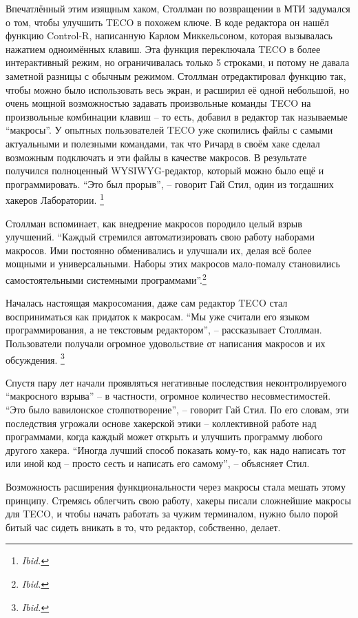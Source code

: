 Впечатлённый этим изящным хаком, Столлман по возвращении в МТИ задумался о том, чтобы улучшить TECO в похожем ключе. В коде редактора он нашёл функцию Control-R, написанную Карлом Миккельсоном, которая вызывалась нажатием одноимённых клавиш. Эта функция переключала TECO в более интерактивный режим, но ограничивалась только 5 строками, и потому не давала заметной разницы с обычным режимом. Столлман отредактировал функцию так, чтобы можно было использовать весь экран, и расширил её одной небольшой, но очень мощной возможностью задавать произвольные команды TECO на произвольные комбинации клавиш -- то есть, добавил в редактор так называемые \enquote{макросы}. У опытных пользователей TECO уже скопились файлы с самыми актуальными и полезными командами, так что Ричард в своём хаке сделал возможным подключать и эти файлы в качестве макросов. В результате получился полноценный WYSIWYG-редактор, который можно было ещё и программировать. \enquote{Это был прорыв}, -- говорит Гай Стил, один из тогдашних хакеров Лаборатории. \footnote{\textit{Ibid.}}

Столлман вспоминает, как внедрение макросов породило целый взрыв улучшений. \enquote{Каждый стремился автоматизировать свою работу наборами макросов. Ими постоянно обменивались и улучшали их, делая всё более мощными и универсальными. Наборы этих макросов мало-помалу становились самостоятельными системными программами}.\footnote{\textit{Ibid.}}

Началась настоящая макросомания, даже сам редактор TECO стал восприниматься как придаток к макросам. \enquote{Мы уже считали его языком программирования, а не текстовым редактором}, -- рассказывает Столлман. Пользователи получали огромное удовольствие от написания макросов и их обсуждения. \footnote{\textit{Ibid.}}

Спустя пару лет начали проявляться негативные последствия неконтролируемого \enquote{макросного взрыва} -- в частности, огромное количество несовместимостей. \enquote{Это было вавилонское столпотворение}, -- говорит Гай Стил. По его словам, эти последствия угрожали основе хакерской этики -- коллективной работе над программами, когда каждый может открыть и улучшить программу любого другого хакера. \enquote{Иногда лучший способ показать кому-то, как надо написать тот или иной код -- просто сесть и написать его самому}, -- объясняет Стил.

Возможность расширения функциональности через макросы стала мешать этому принципу. Стремясь облегчить свою работу, хакеры писали сложнейшие макросы для TECO, и чтобы начать работать за чужим терминалом, нужно было порой битый час сидеть вникать в то, что редактор, собственно, делает.

